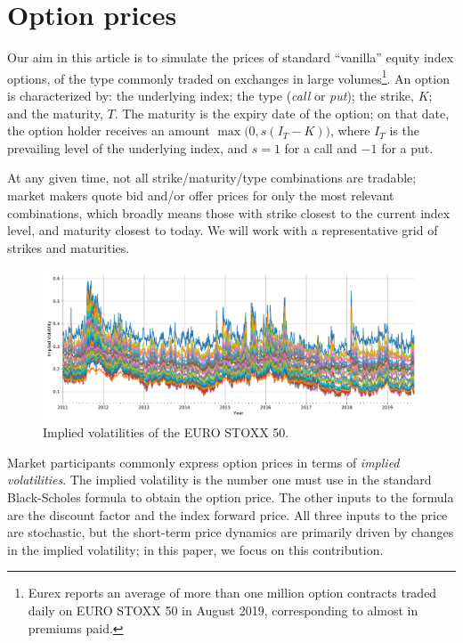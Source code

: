 \documentclass[]{article} %
\begin{document}
\section{Option prices}
Our aim in this article is to simulate the prices of standard ``vanilla'' equity index options, of the type commonly 
traded on exchanges in large volumes\footnote{Eurex \cite{Eurex2019} reports an average of more than one 
million option contracts traded daily on EURO STOXX 50 in August 2019, corresponding to almost 
 in premiums paid.}. An option is characterized by: the underlying index; the type (\emph{call} or 
\emph{put}); the {strike}, $K$; and the {maturity}, $T$. The maturity is the expiry date of the option; 
on that date, the option holder receives an amount $\max\bigl(0,s(I_T-K)\bigr)$, where $I_T$ is the prevailing 
level of the underlying index, and $s=1$ for a call and $-1$ for a put. 

At any given time, not all strike/maturity/type combinations are tradable; market makers quote bid and/or offer
prices for only the most relevant combinations, which broadly means those with strike closest to the current index 
level, and maturity closest to today. We will work with a representative grid of strikes and maturities. 

\begin{figure}[htp]
        \centering
        \includegraphics[width=\textwidth]{figures/imp_vol/plot/historical.pdf}
        \caption{Implied volatilities of the EURO STOXX 50.}
        \label{fig:historical_implied_vols}
\end{figure}

Market participants commonly express option prices in terms of \emph{implied volatilities}. The implied volatility
is the number one must use in the standard Black-Scholes formula \cite{BlackScholes1973} to obtain the option price. 
The other inputs to the formula are the discount factor and the index forward price. All three inputs to the price
are stochastic, but the short-term price dynamics are primarily driven by changes in the implied volatility; in this 
paper, we focus on this contribution.
\end{document}
